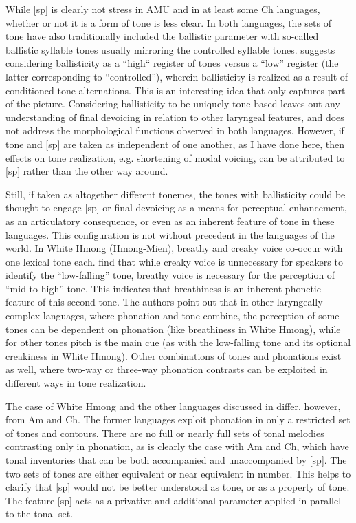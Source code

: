 \documentclass[output=paper]{langscibook}
\begin{document}
\largerpage
While [sp] is clearly not stress in AMU and in at least some Ch languages, whether or not it is a form of tone is less clear. In both languages, the sets of tone have also traditionally included the ballistic parameter with so-called ballistic syllable tones usually mirroring the controlled syllable tones. \citet{Kim2011} suggests considering ballisticity as a “high“ register of tones versus a “low” register (the latter corresponding to ``controlled''), wherein ballisticity is realized as a result of conditioned tone alternations. This is an interesting idea that only captures part of the picture. Considering ballisticity to be uniquely tone-based leaves out any understanding of final devoicing in relation to other laryngeal features, and does not address the morphological functions observed in both languages. However, if tone and [sp] are taken as independent of one another, as I have done here, then effects on tone realization, e.g. shortening of modal voicing, can be attributed to [sp] rather than the other way around.

Still, if taken as altogether different tonemes, the tones with ballisticity could be thought to engage [sp] or final devoicing as a means for perceptual enhancement, as an articulatory consequence, or even as an inherent feature of tone in these languages. This configuration is not without precedent in the languages of the world. In White Hmong (Hmong-Mien), breathy and creaky voice co-occur with one lexical tone each. \citet{Garellek2013} find that while creaky voice is unnecessary for speakers to identify the “low-falling” tone, breathy voice is necessary for the perception of “mid-to-high” tone. This indicates that breathiness is an inherent phonetic feature of this second tone. The authors point out that in other laryngeally complex languages, where phonation and tone combine, the perception of some tones can be dependent on phonation (like breathiness in White Hmong), while for other tones pitch is the main cue (as with the low-falling tone and its optional creakiness in White Hmong). Other combinations of tones and phonations exist as well, where two-way or three-way phonation contrasts can be exploited in different ways in tone realization. 

The case of White Hmong and the other languages discussed in \citet{Garellek2013} differ, however, from Am and Ch. The former languages exploit phonation in only a restricted set of tones and contours. There are no full or nearly full sets of tonal melodies contrasting only in phonation, as is clearly the case with Am and Ch, which have tonal inventories that can be both accompanied and unaccompanied by [sp]. The two sets of tones are either equivalent or near equivalent in number. This helps to clarify that [sp] would not be better understood as tone, or as a property of tone. The feature [sp] acts as a privative and additional parameter applied in parallel to the tonal set. 
\end{document}
